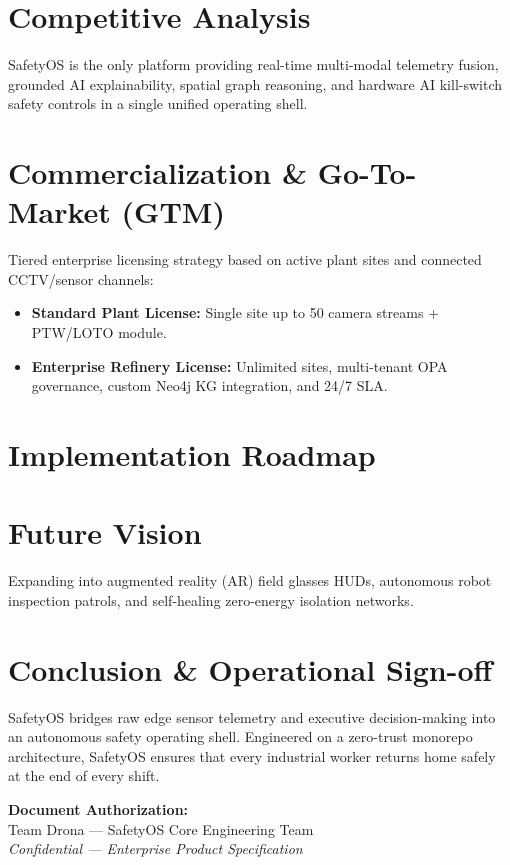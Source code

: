 \documentclass[11pt,a4paper]{article}
\begin{document}
\section{Competitive Analysis}
SafetyOS is the only platform providing real-time multi-modal telemetry fusion, grounded AI explainability, spatial graph reasoning, and hardware AI kill-switch safety controls in a single unified operating shell.

\section{Commercialization \& Go-To-Market (GTM)}
Tiered enterprise licensing strategy based on active plant sites and connected CCTV/sensor channels:
\begin{itemize}
    \item \textbf{Standard Plant License:} Single site up to 50 camera streams + PTW/LOTO module.
    \item \textbf{Enterprise Refinery License:} Unlimited sites, multi-tenant OPA governance, custom Neo4j KG integration, and 24/7 SLA.
\end{itemize}

\section{Implementation Roadmap}


\section{Future Vision}
Expanding into augmented reality (AR) field glasses HUDs, autonomous robot inspection patrols, and self-healing zero-energy isolation networks.

\section{Conclusion \& Operational Sign-off}
SafetyOS bridges raw edge sensor telemetry and executive decision-making into an autonomous safety operating shell. Engineered on a zero-trust monorepo architecture, SafetyOS ensures that every industrial worker returns home safely at the end of every shift.

\vspace{1cm}
\noindent\textbf{Document Authorization:}\\
Team Drona — SafetyOS Core Engineering Team\\
\textit{Confidential — Enterprise Product Specification}
\end{document}

